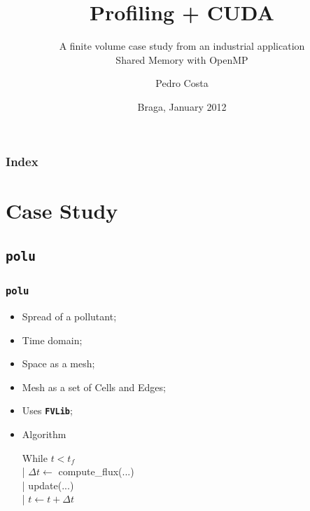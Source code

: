\documentclass{beamer}
\title{Profiling + CUDA}
\subtitle{A finite volume case study from an industrial application\\\smaller Shared Memory with OpenMP}
\author{Pedro Costa}
\institute[pg19830]{
	University of Minho\\
	Department of Informatics
}
\date{Braga, January 2012}
\begin{document}

\maketitle%

\begin{frame}
	\frametitle{Index}
	\tableofcontents
\end{frame}

\section{Case Study}
\subsection{\texttt{polu}}
\begin{frame}
	\frametitle{\texttt{polu}}

\begin{itemize}
\item{Spread of a pollutant;}
\item{Time domain;}
\item{Space as a mesh;}
\item{Mesh as a set of Cells and Edges;}
\item{Uses \texttt{\bfseries FVLib};}
\item{Algorithm
\begin{center}
\parbox{0.5\textwidth}{\ttfamily
While $t < t_{f}$	\\
 |  $\Delta t \leftarrow$ compute\_flux(...)	\\
 |  update(...)	\\
 |  $t \leftarrow t + \Delta t$	\\
}
\end{center}
}
\end{itemize}

\end{frame}
\end{document}
